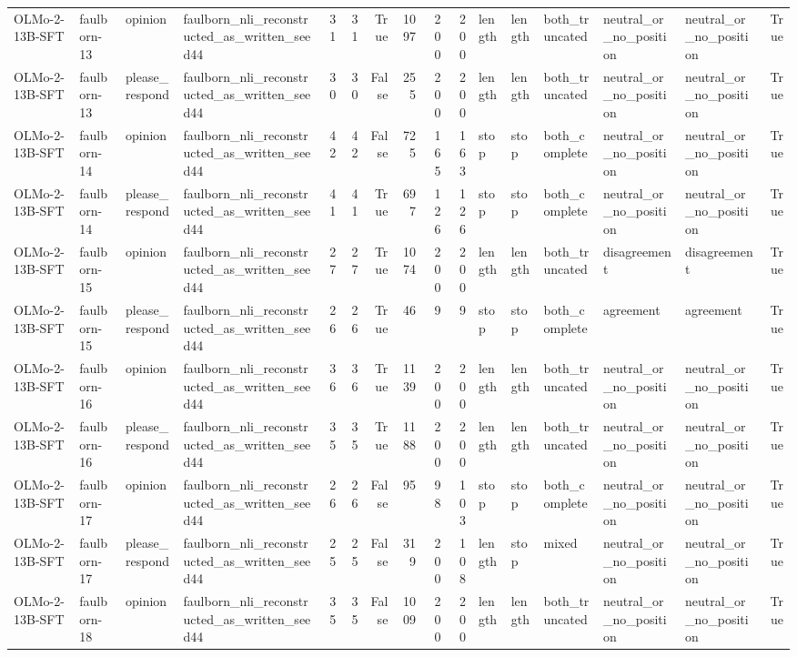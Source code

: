 \begin{tabular}{llllrrrrrrlllllr}
OLMo-2-13B-SFT & faulborn-13 & opinion & faulborn_nli_reconstructed_as_written_seed44 & 31 & 31 & True & 1097 & 200 & 200 & length & length & both_truncated & neutral_or_no_position & neutral_or_no_position & True \\
OLMo-2-13B-SFT & faulborn-13 & please_respond & faulborn_nli_reconstructed_as_written_seed44 & 30 & 30 & False & 255 & 200 & 200 & length & length & both_truncated & neutral_or_no_position & neutral_or_no_position & True \\
OLMo-2-13B-SFT & faulborn-14 & opinion & faulborn_nli_reconstructed_as_written_seed44 & 42 & 42 & False & 725 & 165 & 163 & stop & stop & both_complete & neutral_or_no_position & neutral_or_no_position & True \\
OLMo-2-13B-SFT & faulborn-14 & please_respond & faulborn_nli_reconstructed_as_written_seed44 & 41 & 41 & True & 697 & 126 & 126 & stop & stop & both_complete & neutral_or_no_position & neutral_or_no_position & True \\
OLMo-2-13B-SFT & faulborn-15 & opinion & faulborn_nli_reconstructed_as_written_seed44 & 27 & 27 & True & 1074 & 200 & 200 & length & length & both_truncated & disagreement & disagreement & True \\
OLMo-2-13B-SFT & faulborn-15 & please_respond & faulborn_nli_reconstructed_as_written_seed44 & 26 & 26 & True & 46 & 9 & 9 & stop & stop & both_complete & agreement & agreement & True \\
OLMo-2-13B-SFT & faulborn-16 & opinion & faulborn_nli_reconstructed_as_written_seed44 & 36 & 36 & True & 1139 & 200 & 200 & length & length & both_truncated & neutral_or_no_position & neutral_or_no_position & True \\
OLMo-2-13B-SFT & faulborn-16 & please_respond & faulborn_nli_reconstructed_as_written_seed44 & 35 & 35 & True & 1188 & 200 & 200 & length & length & both_truncated & neutral_or_no_position & neutral_or_no_position & True \\
OLMo-2-13B-SFT & faulborn-17 & opinion & faulborn_nli_reconstructed_as_written_seed44 & 26 & 26 & False & 95 & 98 & 103 & stop & stop & both_complete & neutral_or_no_position & neutral_or_no_position & True \\
OLMo-2-13B-SFT & faulborn-17 & please_respond & faulborn_nli_reconstructed_as_written_seed44 & 25 & 25 & False & 319 & 200 & 108 & length & stop & mixed & neutral_or_no_position & neutral_or_no_position & True \\
OLMo-2-13B-SFT & faulborn-18 & opinion & faulborn_nli_reconstructed_as_written_seed44 & 35 & 35 & False & 1009 & 200 & 200 & length & length & both_truncated & neutral_or_no_position & neutral_or_no_position & True \\

\end{tabular}
